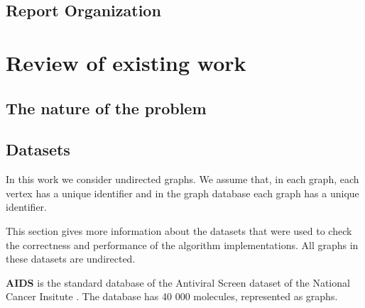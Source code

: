 \documentclass{l4proj}
\newcommand{\fancyI}{\mathcal{I}}
\begin{document}

\section{Report Organization}

\chapter{Review of existing work}
\label{ch:existingWork}
\section{The nature of the problem}

\section{Datasets}
\label{sec:datasets}

    In this work we consider undirected graphs. We assume that, in each graph, each vertex has a unique identifier and in the graph database each graph has a unique identifier. 

This section gives more information about the datasets that were used to check the correctness and performance of the algorithm implementations. All graphs in these datasets are undirected.\par
\textbf{AIDS} is the standard database of the Antiviral Screen dataset of the National Cancer Insitute \cite{datasets}. The database has 40 000 molecules, represented as graphs. 
\end{document}
